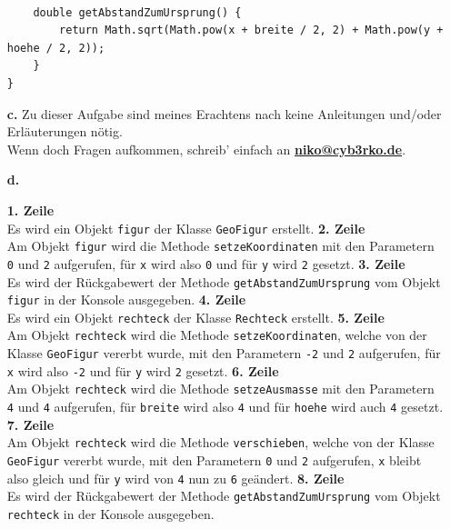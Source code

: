 \documentclass{scrartcl}   %
\begin{document}
\begin{itemize}
\begin{lstlisting}
    
    double getAbstandZumUrsprung() {
        return Math.sqrt(Math.pow(x + breite / 2, 2) + Math.pow(y + hoehe / 2, 2));
    }
}
    \end{lstlisting}
    \item[\textbf{c.}] Zu dieser Aufgabe sind meines Erachtens nach keine Anleitungen und/oder Erläuterungen nötig.\\
Wenn doch Fragen aufkommen, schreib' einfach an \textbf{\href{mailto:niko@cyb3rko.de}{niko@cyb3rko.de}}.
    \item[\textbf{d.}]
    \begin{itemize}
        \barrow \textbf{1. Zeile}\\
        Es wird ein Objekt \texttt{figur} der Klasse \texttt{GeoFigur} erstellt.
        \barrow \textbf{2. Zeile}\\
        Am Objekt \texttt{figur} wird die Methode \texttt{setzeKoordinaten} mit den Parametern \texttt{0} und \texttt{2} aufgerufen, für \texttt{x} wird also \texttt{0} und für \texttt{y} wird \texttt{2} gesetzt.
        \barrow \textbf{3. Zeile}\\
        Es wird der Rückgabewert der Methode \texttt{getAbstandZumUrsprung} vom Objekt \texttt{figur} in der Konsole ausgegeben.
        \barrow \textbf{4. Zeile}\\
        Es wird ein Objekt \texttt{rechteck} der Klasse \texttt{Rechteck} erstellt.
        \barrow \textbf{5. Zeile}\\
        Am Objekt \texttt{rechteck} wird die Methode \texttt{setzeKoordinaten}, welche von der Klasse \texttt{GeoFigur} vererbt wurde, mit den Parametern \texttt{-2} und \texttt{2} aufgerufen, für \texttt{x} wird also \texttt{-2} und für \texttt{y} wird \texttt{2} gesetzt.
        \barrow \textbf{6. Zeile}\\
        Am Objekt \texttt{rechteck} wird die Methode \texttt{setzeAusmasse} mit den Parametern \texttt{4} und \texttt{4} aufgerufen, für \texttt{breite} wird also \texttt{4} und für \texttt{hoehe} wird auch \texttt{4} gesetzt.
        \barrow \textbf{7. Zeile}\\
        Am Objekt \texttt{rechteck} wird die Methode \texttt{verschieben}, welche von der Klasse \texttt{GeoFigur} vererbt wurde, mit den Parametern \texttt{0} und \texttt{2} aufgerufen, \texttt{x} bleibt also gleich und für \texttt{y} wird von \texttt{4} nun zu \texttt{6} geändert.
        \barrow \textbf{8. Zeile}\\
        Es wird der Rückgabewert der Methode \texttt{getAbstandZumUrsprung} vom Objekt \texttt{rechteck} in der Konsole ausgegeben.

\end{itemize}
\end{itemize}
\end{document}
